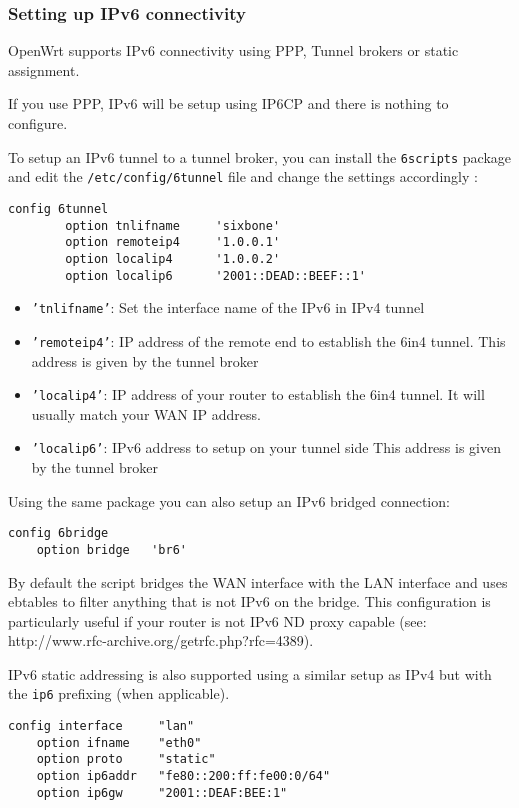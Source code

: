\subsubsection{Setting up IPv6 connectivity}

OpenWrt supports IPv6 connectivity using PPP, Tunnel brokers or static
assignment.

If you use PPP, IPv6 will be setup using IP6CP and there is nothing to
configure.

To setup an IPv6 tunnel to a tunnel broker, you can install the
\texttt{6scripts} package and edit the \texttt{/etc/config/6tunnel}
file and change the settings accordingly :

\begin{Verbatim}
config 6tunnel
        option tnlifname     'sixbone'
        option remoteip4     '1.0.0.1'
        option localip4      '1.0.0.2'
        option localip6      '2001::DEAD::BEEF::1'
\end{Verbatim}

\begin{itemize}
    \item{\texttt{'tnlifname'}:}
        Set the interface name of the IPv6 in IPv4 tunnel
    \item{\texttt{'remoteip4'}:}
        IP address of the remote end to establish the 6in4 tunnel.
	This address is given by the tunnel broker
    \item{\texttt{'localip4'}:}
	IP address of your router to establish the 6in4 tunnel.
	It will usually match your WAN IP address.
    \item{\texttt{'localip6'}:}
	IPv6 address to setup on your tunnel side
	This address is given by the tunnel broker
\end{itemize}

Using the same package you can also setup an IPv6 bridged connection:

\begin{Verbatim}
config 6bridge
	option bridge	'br6'
\end{Verbatim}

By default the script bridges the WAN interface with the LAN interface
and uses ebtables to filter anything that is not IPv6 on the bridge.
This configuration is particularly useful if your router is not
IPv6 ND proxy capable (see: http://www.rfc-archive.org/getrfc.php?rfc=4389).

IPv6 static addressing is also supported using a similar setup as
IPv4 but with the \texttt{ip6} prefixing (when applicable).

\begin{Verbatim}
config interface     "lan"
    option ifname    "eth0"
    option proto     "static"
    option ip6addr   "fe80::200:ff:fe00:0/64"
    option ip6gw     "2001::DEAF:BEE:1"
\end{Verbatim}
